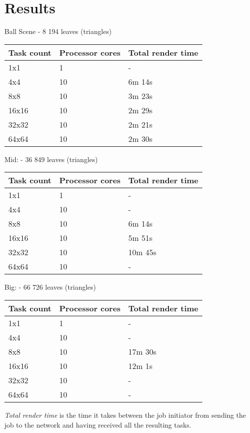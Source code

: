 \chapter{Results}

\begin{center}
    Ball Scene - 8 194 leaves (triangles)
    \begin{tabular}{ | l | l | l |} \hline
    Task count & Processor cores & Total render time \\ \hline
    1x1 & 1 & - \\ \hline
    4x4 & 10 & 6m 14s \\ \hline
    8x8 & 10 & 3m 23s \\ \hline
    16x16 & 10 & 2m 29s \\ \hline
    32x32 & 10 & 2m 21s \\ \hline
    64x64 & 10 & 2m 30s \\ \hline
    \end{tabular}
    
    Mid:    - 36 849 leaves (triangles)
    \begin{tabular}{ | l | l | l |} \hline
    Task count & Processor cores & Total render time \\ \hline
    1x1 & 1 & - \\ \hline
    4x4 & 10 & - \\ \hline
    8x8 & 10 & 6m 14s \\ \hline
    16x16 & 10 & 5m 51s \\ \hline
    32x32 & 10 & 10m 45s \\ \hline
    64x64 & 10 & - \\ \hline
    \end{tabular}
    
    Big:    - 66 726 leaves (triangles)
    \begin{tabular}{ | l | l | l |} \hline
    Task count & Processor cores & Total render time \\ \hline
    1x1 & 1 & - \\ \hline
    4x4 & 10 & - \\ \hline
    8x8 & 10 & 17m 30s \\ \hline
    16x16 & 10 & 12m 1s \\ \hline
    32x32 & 10 & - \\ \hline
    64x64 & 10 & - \\ \hline
    \end{tabular}
    
    \emph{Total render time} is the time it takes between the job initiator from sending the job to the network and having received all the resulting tasks.
\end{center}

